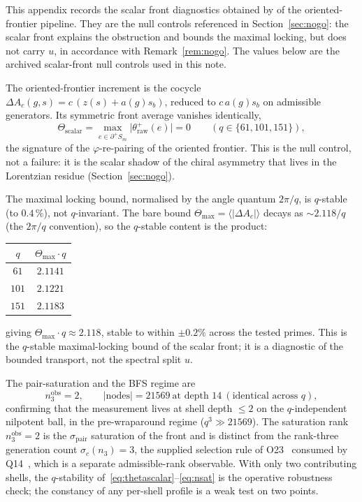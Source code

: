 \documentclass[11pt]{article}
\theoremstyle{definition}
\begin{document}
    This appendix records the scalar front diagnostics obtained by of the
    oriented-frontier pipeline.
    They are the null controls referenced in Section~\ref{sec:nogo}: the scalar front explains the
    obstruction and bounds the maximal locking, but does not carry $u$, in accordance with
    Remark~\ref{rem:nogo}.
    The values below are the archived scalar-front null controls used in this note.

    The oriented-frontier increment is the cocycle $\Delta A_c(g,s)=c\,(z(s)+a(g)s_b)$, reduced to
    $c\,a(g)s_b$ on admissible generators.
    Its symmetric front average vanishes identically,
    \begin{equation}
      \label{eq:thetascalar}
      \Theta_{\mathrm{scalar}}=\max_{e\in\partial^+ S_m}\big|\theta^+_{\mathrm{raw}}(e)\big|=0
      \qquad (q\in\{61,101,151\}),
    \end{equation}
    the signature of the $\varphi$-re-pairing of the oriented frontier.
    This is the null control, not a failure: it is the scalar shadow of the chiral asymmetry that lives
    in the Lorentzian residue (Section~\ref{sec:nogo}).

    The maximal locking bound, normalised by the angle quantum $2\pi/q$, is $q$-stable (to $0.4\,\%$), not $q$-invariant.
    The bare bound $\Theta_{\max}=\langle|\Delta A_c|\rangle$ decays as $\sim 2.118/q$ (the $2\pi/q$
    convention), so the $q$-stable content is the product:
    \begin{center}
      \begin{tabular}{cc}
        \hline
        $q$ & $\Theta_{\max}\cdot q$\\
        \hline
        $61$ & $2.1141$\\
        $101$ & $2.1221$\\
        $151$ & $2.1183$\\
        \hline
      \end{tabular}
    \end{center}
    giving $\Theta_{\max}\cdot q\approx 2.118$, stable to within $\pm 0.2\%$ across the tested primes.
    This is the $q$-stable maximal-locking bound of the scalar front; it is a diagnostic of the bounded
    transport, not the spectral split $u$.

    The pair-saturation and the BFS regime are
    \begin{equation}
      \label{eq:nsat}
      n_3^{\mathrm{obs}}=2,\qquad |\mathrm{nodes}|=21569 \ \text{at depth }14\ (\text{identical across }q),
    \end{equation}
    confirming that the measurement lives at shell depth $\le 2$ on the $q$-independent nilpotent ball,
    in the pre-wraparound regime ($q^3\gg 21569$).
    The saturation rank $n_3^{\mathrm{obs}}=2$ is the $\sigma_{\mathrm{pair}}$ saturation of the front and
    is distinct from the rank-three generation count $\sigma_c(n_3)=3$, the supplied selection
    rule of O23~\cite{Beau2026a27} consumed by Q14~\cite{Beau2026q14}, which is a
    separate admissible-rank observable.
    With only two contributing shells, the $q$-stability of~\eqref{eq:thetascalar}--\eqref{eq:nsat} is the
    operative robustness check; the constancy of any per-shell profile is a weak test on two points.
\end{document}
